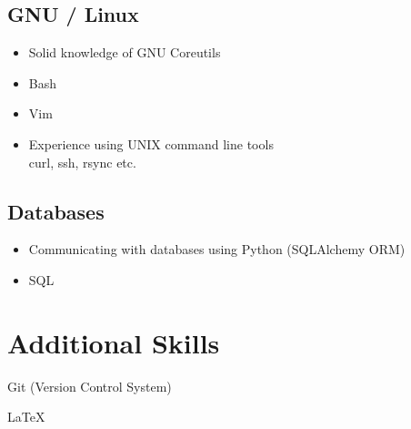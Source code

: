 \documentclass[a4paper, 13pt, draft]{article}
\begin{document}
    \begin{multicols}{2}

	\subsection*{GNU / Linux}

	\begin{itemize}
	    \setlength\itemsep{0em}
	\item Solid knowledge of GNU Coreutils
	\item Bash
	\item Vim
	\item Experience using UNIX command line tools \\curl, ssh, rsync etc.
    \end{itemize}

    \subsection*{Databases}

    \begin{itemize}
	\setlength\itemsep{0em}
    \item Communicating with databases using Python (SQLAlchemy ORM)
    \item SQL \\
\end{itemize}

\end{multicols}

\section*{Additional Skills}

\begin{itemize}
    \begin{multicols}{2}
    \item Git (Version Control System)
    \item \LaTeX
    \end{multicols}
\end{itemize}
\end{document}
